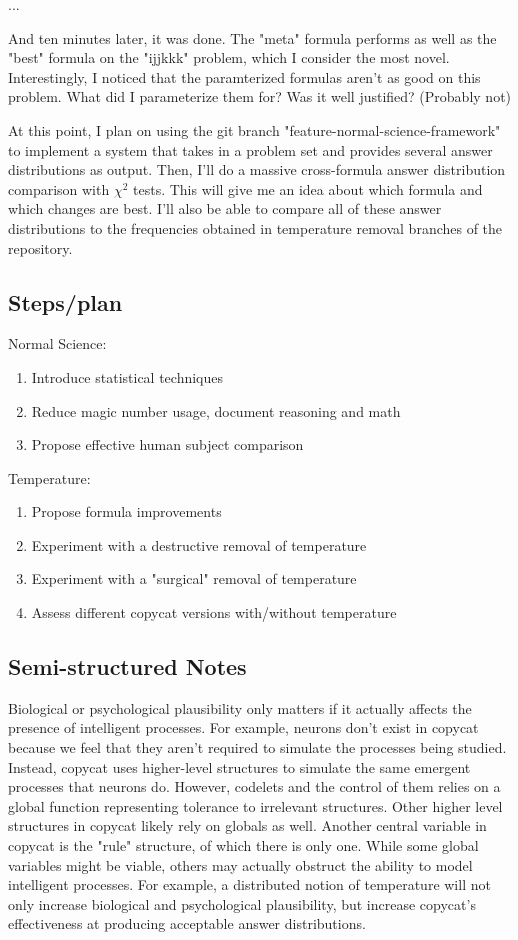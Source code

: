 \documentclass[a4paper]{article}
\begin{document}
\break
...
\break

And ten minutes later, it was done.
The "meta" formula performs as well as the "best" formula on the "ijjkkk" problem, which I consider the most novel.
Interestingly, I noticed that the paramterized formulas aren't as good on this problem. What did I parameterize them for? Was it well justified?
(Probably not)

At this point, I plan on using the git branch "feature-normal-science-framework" to implement a system that takes in a problem set and provides several answer distributions as output.
Then, I'll do a massive cross-formula answer distribution comparison with $\chi^2$ tests. This will give me an idea about which formula and which changes are best.
I'll also be able to compare all of these answer distributions to the frequencies obtained in temperature removal branches of the repository.

\subsection{Steps/plan}

Normal Science:
\begin{enumerate}
	\item Introduce statistical techniques
    \item Reduce magic number usage, document reasoning and math
    \item Propose effective human subject comparison
\end{enumerate}
Temperature:
\begin{enumerate}
	\item Propose formula improvements
    \item Experiment with a destructive removal of temperature
    \item Experiment with a "surgical" removal of temperature
    \item Assess different copycat versions with/without temperature
\end{enumerate}

\subsection{Semi-structured Notes}

Biological or psychological plausibility only matters if it actually affects the presence of intelligent processes. For example, neurons don't exist in copycat because we feel that they aren't required to simulate the processes being studied. Instead, copycat uses higher-level structures to simulate the same emergent processes that neurons do. However, codelets and the control of them relies on a global function representing tolerance to irrelevant structures. Other higher level structures in copycat likely rely on globals as well. Another central variable in copycat is the "rule" structure, of which there is only one. While some global variables might be viable, others may actually obstruct the ability to model intelligent processes. For example, a distributed notion of temperature will not only increase biological and psychological plausibility, but increase copycat's effectiveness at producing acceptable answer distributions.
\end{document}
